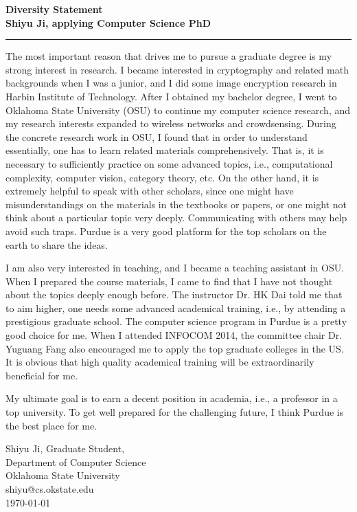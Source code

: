 \documentclass{letter}
\begin{document}
{\bf Diversity Statement}\\
{\bf Shiyu Ji, applying Computer Science PhD}\\
\rule{\textwidth}{1pt}

The most important reason that drives me to pursue a graduate degree is my strong interest in research. I became interested in cryptography and related math backgrounds when I was a junior, and I did some image encryption research in Harbin Institute of Technology. After I obtained my bachelor degree, I went to Oklahoma State University (OSU) to continue my computer science research, and my research interests expanded to wireless networks and crowdsensing. During the concrete research work in OSU, I found that in order to understand essentially, one has to learn related materials comprehensively. That is, it is necessary to sufficiently practice on some advanced topics, i.e., computational complexity, computer vision, category theory, etc. On the other hand, it is extremely helpful to speak with other scholars, since one might have misunderstandings on the materials in the textbooks or papers, or one might not think about a particular topic very deeply. Communicating with others may help avoid such traps. Purdue is a very good platform for the top scholars on the earth to share the ideas.

I am also very interested in teaching, and I became a teaching assistant in OSU. When I prepared the course materials, I came to find that I have not thought about the topics deeply enough before. The instructor Dr. HK Dai told me that to aim higher, one needs some advanced academical training, i.e., by attending a prestigious graduate school. The computer science program in Purdue is a pretty good choice for me. When I attended INFOCOM 2014, the committee chair Dr. Yuguang Fang also encouraged me to apply the top graduate colleges in the US. It is obvious that high quality academical training will be extraordinarily beneficial for me.

My ultimate goal is to earn a decent position in academia, i.e., a professor in a top university. To get well prepared for the challenging future, I think Purdue is the best place for me.

Shiyu Ji, Graduate Student,\\
Department of Computer Science\\
Oklahoma State University\\
shiyu@cs.okstate.edu\\
\today{}
\end{document}
